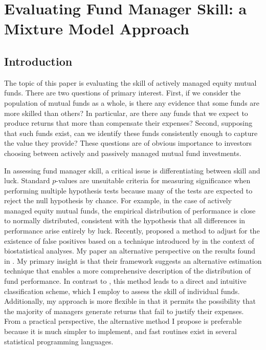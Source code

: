 \chapter{Evaluating Fund Manager Skill: a Mixture Model Approach}
\label{chapter:two}

\section{Introduction}
	The topic of this paper is evaluating the skill of actively managed equity mutual funds.  There are two questions of primary interest.  First, if we consider the population of mutual funds as a whole, is there any evidence that some funds are more skilled than others?  In particular, are there any funds that we expect to produce returns that more than compensate their expenses?  Second, supposing that such funds exist, can we identify these funds consistently enough to capture the value they provide?  These questions are of obvious importance to investors choosing between actively and passively managed mutual fund investments.

	In assessing fund manager skill, a critical issue is differentiating between skill and luck. Standard $p$-values are unsuitable criteria for measuring significance when performing multiple hypothesis tests because many of the tests are expected to reject the null hypothesis by chance.  For example, in the case of actively managed equity mutual funds, the empirical distribution of performance is close to normally distributed, consistent with the hypothesis that all differences in performance arise entirely by luck. Recently, \citet{Barras2010} proposed a method to adjust for the existence of false positives based on a technique introduced by \citet{Storey2002} in the context of biostatistical analyses. My paper an alternative perspective on the results found in \citet{Barras2010}. My primary insight is that their framework suggests an alternative estimation technique that enables a more comprehensive description of the distribution of fund performance. In contrast to \citet{Barras2010}, this method leads to a direct and intuitive classification scheme, which I employ to assess the skill of individual funds.  Additionally, my approach is more flexible in that it permits the possibility that the majority of managers generate returns that fail to justify their expenses. From a practical perspective, the alternative method I propose is preferable because it is much simpler to implement, and fast routines exist in several statistical programming languages.

